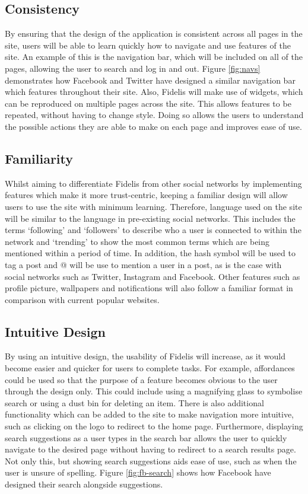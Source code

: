 \subsection{Consistency}
By ensuring that the design of the application is consistent across all pages in the site, users will be able to learn quickly how to navigate and use features of the site. An example of this is the navigation bar, which will be included on all of the pages, allowing the user to search and log in and out. Figure \ref{fig:navs} demonstrates how Facebook and Twitter have designed a similar navigation bar which features throughout their site. Also, Fidelis will make use of widgets, which can be reproduced on multiple pages across the site. This allows features to be repeated, without having to change style. Doing so allows the users to understand the possible actions they are able to make on each page and improves ease of use.

\subsection{Familiarity}
Whilst aiming to differentiate Fidelis from other social networks by implementing features which make it more trust-centric, keeping a familiar design will allow users to use the site with minimum learning. Therefore, language used on the site will be similar to the language in pre-existing social networks. This includes the terms `following' and `followers' to describe who a user is connected to within the network and `trending' to show the most common terms which are being mentioned within a period of time. In addition, the hash symbol will be used to tag a post and @ will be use to mention a user in a post, as is the case with social networks such as Twitter, Instagram and Facebook. Other features such as profile picture, wallpapers and notifications will also follow a familiar format in comparison with current popular websites.

\subsection{Intuitive Design}
By using an intuitive design, the usability of Fidelis will increase, as it would become easier and quicker for users to complete tasks. For example, affordances could be used so that the purpose of a feature becomes obvious to the user through the design only. This could include using a magnifying glass to symbolise search or using a dust bin for deleting an item. There is also additional functionality which can be added to the site to make navigation more intuitive, such as clicking on the logo to redirect to the home page. Furthermore, displaying search suggestions as a user types in the search bar allows the user to quickly navigate to the desired page without having to redirect to a search results page. Not only this, but showing search suggestions aids ease of use, such as when the user is unsure of spelling. Figure \ref{fig:fb-search} shows how Facebook have designed their search alongside suggestions.

